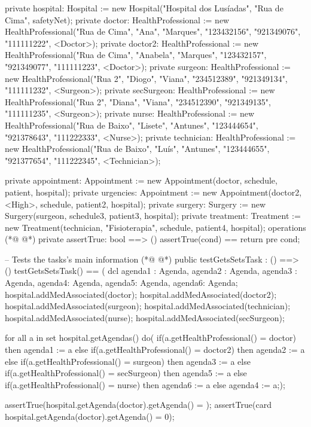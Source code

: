 \begin{vdmpp}[breaklines=true]
  private hospital: Hospital := new Hospital("Hospital dos Lusíadas", "Rua de Cima", safetyNet);
  private doctor: HealthProfessional := new HealthProfessional("Rua de Cima", "Ana", "Marques", "123432156", "921349076", "111111222", <Doctor>);
  private doctor2: HealthProfessional := new HealthProfessional("Rua de Cima", "Anabela", "Marques", "123432157", "921349077", "111111223", <Doctor>);
  private surgeon: HealthProfessional := new HealthProfessional("Rua 2", "Diogo", "Viana", "234512389", "921349134", "111111232", <Surgeon>);
  private secSurgeon: HealthProfessional := new HealthProfessional("Rua 2", "Diana", "Viana", "234512390", "921349135", "111111235", <Surgeon>);
 private nurse: HealthProfessional := new HealthProfessional("Rua de Baixo", "Lisete", "Antunes", "123444654", "921378643", "111222333", <Nurse>);
 private technician: HealthProfessional := new HealthProfessional("Rua de Baixo", "Luís", "Antunes", "123444655", "921377654", "111222345", <Technician>);
 
 private appointment: Appointment := new Appointment(doctor, schedule, patient, hospital);
 private urgencies: Appointment := new Appointment(doctor2, <High>, schedule, patient2, hospital);
 private surgery: Surgery := new Surgery(surgeon, schedule3, patient3, hospital);
 private treatment: Treatment := new Treatment(technician, "Fisioterapia", schedule, patient4, hospital);
operations
(*@
\label{assertTrue:57}
@*)
 private assertTrue: bool ==> ()
  assertTrue(cond) == return
 pre cond;
 
 -- Tests the tasks's main information
(*@
\label{testGetsSetsTask:62}
@*)
 public testGetsSetsTask : () ==> ()
  testGetsSetsTask() == (
   dcl agenda1 : Agenda, agenda2 : Agenda, agenda3 : Agenda, agenda4: Agenda, agenda5: Agenda, agenda6: Agenda;
   hospital.addMedAssociated(doctor);
   hospital.addMedAssociated(doctor2);
   hospital.addMedAssociated(surgeon);
   hospital.addMedAssociated(technician);
   hospital.addMedAssociated(nurse);
   hospital.addMedAssociated(secSurgeon);
   
   for all a in set hospital.getAgendas() do(
    if(a.getHealthProfessional() = doctor)
     then agenda1 := a
    else if(a.getHealthProfessional() = doctor2)
     then agenda2 := a
    else if(a.getHealthProfessional() = surgeon)
     then agenda3 := a
    else if(a.getHealthProfessional() = secSurgeon)
     then agenda5 := a
    else if(a.getHealthProfessional() = nurse)
     then agenda6 := a
    else
     agenda4 := a;);
   
   assertTrue(hospital.getAgenda(doctor).getAgenda() = {});
   assertTrue(card hospital.getAgenda(doctor).getAgenda() = 0);
   

\end{vdmpp}
